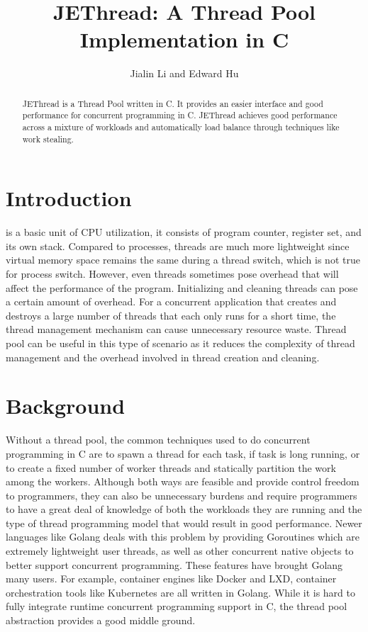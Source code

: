 \documentclass[journal, a4paper]{IEEEtran}
\begin{document}
	\title{JEThread: A Thread Pool Implementation in C}
	\author{Jialin Li and Edward Hu}
	\maketitle

\begin{abstract}
	JEThread is a Thread Pool written in C. It provides an easier interface and good performance for concurrent programming in C. JEThread achieves good performance across a mixture of workloads and automatically load balance through techniques like work stealing.
\end{abstract}

\section{Introduction}
	 is a basic unit of CPU utilization, it consists of program counter, register set, and its own stack. Compared to processes, threads are much more lightweight since virtual memory space remains the same during a thread switch, which is not true for process switch. However, even threads sometimes pose overhead that will affect the performance of the program. Initializing and cleaning threads can pose a certain amount of overhead. For a concurrent application that creates and destroys a large number of threads that each only runs for a short time, the thread management mechanism can cause unnecessary resource waste. Thread pool can be useful in this type of scenario as it reduces the complexity of thread management and the overhead involved in thread creation and cleaning. 

\section{Background}	
	Without a thread pool, the common techniques used to do concurrent programming in C are to spawn a thread for each task, if task is long running, or to create a fixed number of worker threads and statically partition the work among the workers. Although both ways are feasible and provide control freedom to programmers, they can also be unnecessary burdens and require programmers to have a great deal of knowledge of both the workloads they are running and the type of thread programming model that  would result in good performance. Newer languages like Golang deals with this problem by providing Goroutines which are extremely lightweight user threads, as well as other concurrent native objects to better support concurrent programming. These features have brought Golang many users. For example, container engines like Docker and LXD, container orchestration tools like Kubernetes are all written in Golang. While it is hard to fully integrate runtime concurrent programming support in C, the thread pool abstraction provides a good middle ground.
		
\end{document}
